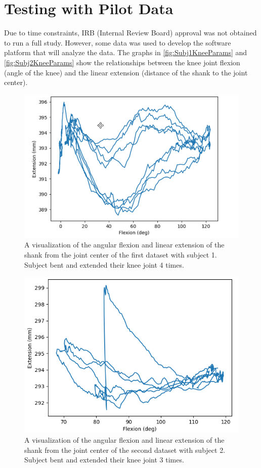 \section{Testing with Pilot Data}
Due to time constraints, IRB (Internal Review Board) approval was not obtained to run a full study. However, some data was used to develop the software platform that will analyze the data. The graphs in \autoref{fig:Subj1KneeParams} and \autoref{fig:Subj2KneeParams} show the relationships between the knee joint flexion (angle of the knee) and the linear extension (distance of the shank to the joint center).

\begin{figure}[ht!]
    \centering
    \includegraphics[width=\textwidth]{Figures/Param/Subj1_KneeProfile.png}
    \caption{A visualization of the angular flexion and linear extension of the shank from the joint center of the first dataset with subject 1. Subject bent and extended their knee joint 4 times.}
    \label{fig:Subj1KneeParams}
\end{figure}

\begin{figure}[ht!]
    \centering
    \includegraphics[width=\textwidth]{Figures/Param/Subj2_KneeProfile.png}
    \caption{A visualization of the angular flexion and linear extension of the shank from the joint center of the second dataset with subject 2. Subject bent and extended their knee joint 3 times.}
    \label{fig:Subj2KneeParams}
\end{figure}

